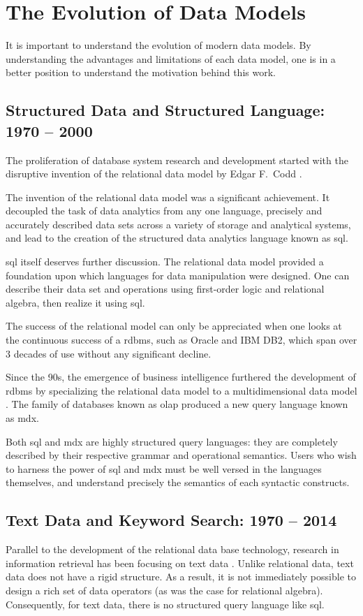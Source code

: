 \section{The Evolution of Data Models}
	It is important to understand the evolution of modern data models.  By understanding the advantages and limitations of each data model, one is in a better position to understand the motivation behind this work.
	
	\subsection{Structured Data and Structured Language:  1970 -- 2000}
		The proliferation of database system research and development started with the disruptive invention of the relational data model by Edgar F.~Codd \cite{codd-79}.
		
		The invention of the relational data model was a significant achievement.  It decoupled the task of data analytics from any one language, precisely and accurately described data sets across a variety of storage and analytical systems, and lead to the creation of the structured data analytics language known as \gls{sql}.
		
		\gls{sql} itself deserves further discussion.  The relational data model provided a foundation upon which languages for data manipulation were designed.  One can describe their data set and operations using first-order logic and relational algebra, then realize it using \gls{sql}.
		
		The success of the relational model can only be appreciated when one looks at the continuous success of a \gls{rdbms}, such as Oracle and IBM DB2, which span over 3 decades of use without any significant decline.
		
		Since the 90s, the emergence of business intelligence \cite{bikm-02} furthered the development of \gls{rdbms} by specializing the relational data model to a multidimensional data model \cite{colliat-96}.  The family of databases known as \gls{olap} produced a new query language known as \gls{mdx}.
		
		Both \gls{sql} and \gls{mdx} are highly structured query languages: they are completely described by their respective grammar and operational semantics.  Users who wish to harness the power of \gls{sql} and \gls{mdx} must be well versed in the languages themselves, and understand precisely the semantics of each syntactic constructs.
		
	\subsection{Text Data and Keyword Search:  1970 -- 2014}
		Parallel to the development of the relational data base technology, research in information retrieval has been focusing on text data \cite{salton-88, jones-72}.  Unlike relational data, text data does not have a rigid structure.  As a result, it is not immediately possible to design a rich set of data operators (as was the case for relational algebra).  Consequently, for text data, there is no structured query language like \gls{sql}.
		
